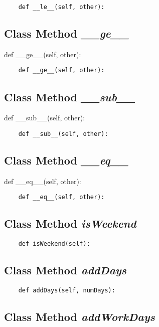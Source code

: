 \documentclass[twoside,11pt]{book}
\begin{document}
\begin{lstlisting}
    def __le__(self, other):
\end{lstlisting}

\subsection{Class Method {\it \_\_ge\_\_}}
def \_\_ge\_\_(self, other):

\begin{lstlisting}
    def __ge__(self, other):
\end{lstlisting}

\subsection{Class Method {\it \_\_sub\_\_}}
def \_\_sub\_\_(self, other):

\begin{lstlisting}
    def __sub__(self, other):
\end{lstlisting}

\subsection{Class Method {\it \_\_eq\_\_}}
def \_\_eq\_\_(self, other):

\begin{lstlisting}
    def __eq__(self, other):
\end{lstlisting}

\subsection{Class Method {\it isWeekend}}


\begin{lstlisting}
    def isWeekend(self):
\end{lstlisting}

\subsection{Class Method {\it addDays}}


\begin{lstlisting}
    def addDays(self, numDays):
\end{lstlisting}

\subsection{Class Method {\it addWorkDays}}
\end{document}
